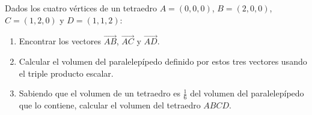 Dados los cuatro vértices de un tetraedro $A = (0,0,0)$, $B = (2,0,0)$, $C = (1,2,0)$ y $D = (1,1,2)$:
\begin{enumerate}
    \item Encontrar los vectores $\overrightarrow{AB}$, $\overrightarrow{AC}$ y $\overrightarrow{AD}$.
    \item Calcular el volumen del paralelepípedo definido por estos tres vectores usando el triple producto escalar.
    \item Sabiendo que el volumen de un tetraedro es $\frac{1}{6}$ del volumen del paralelepípedo que lo contiene, calcular el volumen del tetraedro $ABCD$.
\end{enumerate}